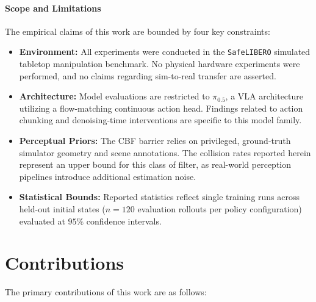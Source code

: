 \documentclass[a4paper,11pt]{report}
\begin{document}
\paragraph{Scope and Limitations}
The empirical claims of this work are bounded by four key constraints:
\begin{itemize}
    \item \textbf{Environment:} All experiments were conducted in the \texttt{SafeLIBERO} simulated tabletop manipulation benchmark. No physical hardware experiments were performed, and no claims regarding sim-to-real transfer are asserted.
    \item \textbf{Architecture:} Model evaluations are restricted to $\pi_{0.5}$, a VLA architecture utilizing a flow-matching continuous action head. Findings related to action chunking and denoising-time interventions are specific to this model family.
    \item \textbf{Perceptual Priors:} The CBF barrier relies on privileged, ground-truth simulator geometry and scene annotations. The collision rates reported herein represent an upper bound for this class of filter, as real-world perception pipelines introduce additional estimation noise.
    \item \textbf{Statistical Bounds:} Reported statistics reflect single training runs across held-out initial states ($n = 120$ evaluation rollouts per policy configuration) evaluated at $95\%$ confidence intervals.
\end{itemize}

\section{Contributions}

The primary contributions of this work are as follows:
\end{document}
